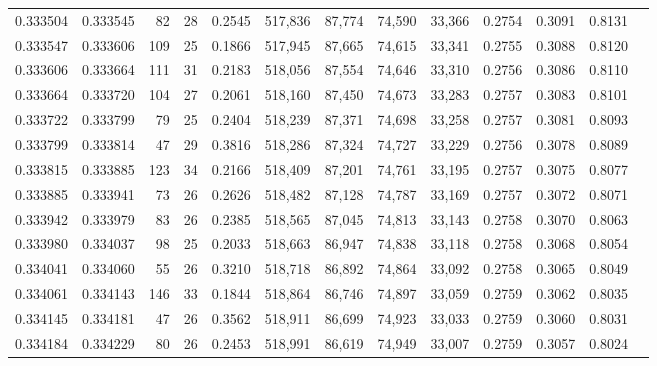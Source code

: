 \begin{tabular}{rrrrrrrrrrrrr}
0.333504 & 0.333545 &    82 &  28 &                                     0.2545 & 517,836 &  87,774 &  74,590 &  33,366 & 0.2754 & 0.3091 & 0.8131 \\
0.333547 & 0.333606 &   109 &  25 &                                     0.1866 & 517,945 &  87,665 &  74,615 &  33,341 & 0.2755 & 0.3088 & 0.8120 \\
0.333606 & 0.333664 &   111 &  31 &                                     0.2183 & 518,056 &  87,554 &  74,646 &  33,310 & 0.2756 & 0.3086 & 0.8110 \\
0.333664 & 0.333720 &   104 &  27 &                                     0.2061 & 518,160 &  87,450 &  74,673 &  33,283 & 0.2757 & 0.3083 & 0.8101 \\
0.333722 & 0.333799 &    79 &  25 &                                     0.2404 & 518,239 &  87,371 &  74,698 &  33,258 & 0.2757 & 0.3081 & 0.8093 \\
0.333799 & 0.333814 &    47 &  29 &                                     0.3816 & 518,286 &  87,324 &  74,727 &  33,229 & 0.2756 & 0.3078 & 0.8089 \\
0.333815 & 0.333885 &   123 &  34 &                                     0.2166 & 518,409 &  87,201 &  74,761 &  33,195 & 0.2757 & 0.3075 & 0.8077 \\
0.333885 & 0.333941 &    73 &  26 &                                     0.2626 & 518,482 &  87,128 &  74,787 &  33,169 & 0.2757 & 0.3072 & 0.8071 \\
0.333942 & 0.333979 &    83 &  26 &                                     0.2385 & 518,565 &  87,045 &  74,813 &  33,143 & 0.2758 & 0.3070 & 0.8063 \\
0.333980 & 0.334037 &    98 &  25 &                                     0.2033 & 518,663 &  86,947 &  74,838 &  33,118 & 0.2758 & 0.3068 & 0.8054 \\
0.334041 & 0.334060 &    55 &  26 &                                     0.3210 & 518,718 &  86,892 &  74,864 &  33,092 & 0.2758 & 0.3065 & 0.8049 \\
0.334061 & 0.334143 &   146 &  33 &                                     0.1844 & 518,864 &  86,746 &  74,897 &  33,059 & 0.2759 & 0.3062 & 0.8035 \\
0.334145 & 0.334181 &    47 &  26 &                                     0.3562 & 518,911 &  86,699 &  74,923 &  33,033 & 0.2759 & 0.3060 & 0.8031 \\
0.334184 & 0.334229 &    80 &  26 &                                     0.2453 & 518,991 &  86,619 &  74,949 &  33,007 & 0.2759 & 0.3057 & 0.8024 \\

\end{tabular}
